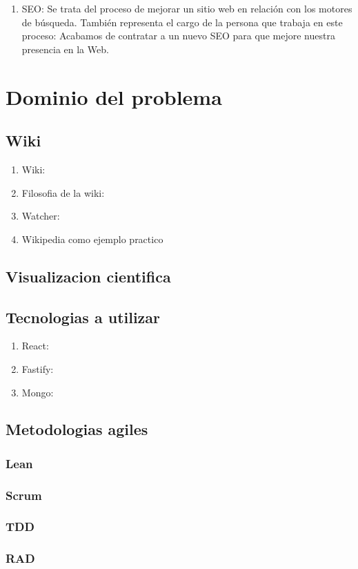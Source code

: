 






\begin{enumerate}
    \item SEO: Se trata del proceso de mejorar un sitio web en relación con los motores de búsqueda. También representa el cargo de la persona que trabaja en este proceso: Acabamos de contratar a un nuevo SEO para que mejore nuestra presencia en la Web. \cite{SEO}

\end{enumerate}

\section{Dominio del problema}
    \subsection{Wiki}
    \begin{enumerate}
    \item Wiki:
    \item Filosofia de la wiki:
    \item Watcher:
    \item Wikipedia como ejemplo practico
    \end{enumerate}

    \subsection{Visualizacion cientifica}


\subsection{Tecnologias a utilizar}
\begin{enumerate}
    \item React:
    \item Fastify:
    \item Mongo:
\end{enumerate}


\subsection{Metodologias agiles}
    \subsubsection{Lean}
    \subsubsection{Scrum}
    \subsubsection{TDD}
    \subsubsection{RAD}

